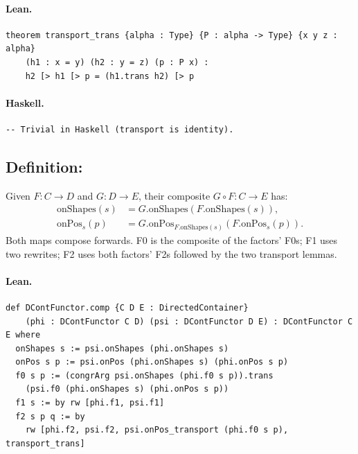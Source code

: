\documentclass[11pt,a4paper]{article}
\begin{document}
\paragraph{Lean.}
\begin{lstlisting}[style=lean]
theorem transport_trans {alpha : Type} {P : alpha -> Type} {x y z : alpha}
    (h1 : x = y) (h2 : y = z) (p : P x) :
    h2 [> h1 [> p = (h1.trans h2) [> p
\end{lstlisting}

\paragraph{Haskell.}
\begin{lstlisting}[style=haskell]
-- Trivial in Haskell (transport is identity).
\end{lstlisting}


\subsection{Definition: }

\begin{defn}
Given $F : C \to D$ and $G : D \to E$, their composite $G \circ F : C \to E$
has:
\begin{align*}
  \mathrm{onShapes}(s) &= G.\mathrm{onShapes}(F.\mathrm{onShapes}(s)), \\
  \mathrm{onPos}_s(p) &= G.\mathrm{onPos}_{F.\mathrm{onShapes}(s)}(F.\mathrm{onPos}_s(p)).
\end{align*}
Both maps compose forwards.  F0 is the composite of the factors' F0s; F1 uses
two rewrites; F2 uses both factors' F2s followed by the two transport lemmas.
\end{defn}

\paragraph{Lean.}
\begin{lstlisting}[style=lean]
def DContFunctor.comp {C D E : DirectedContainer}
    (phi : DContFunctor C D) (psi : DContFunctor D E) : DContFunctor C E where
  onShapes s := psi.onShapes (phi.onShapes s)
  onPos s p := psi.onPos (phi.onShapes s) (phi.onPos s p)
  f0 s p := (congrArg psi.onShapes (phi.f0 s p)).trans
    (psi.f0 (phi.onShapes s) (phi.onPos s p))
  f1 s := by rw [phi.f1, psi.f1]
  f2 s p q := by
    rw [phi.f2, psi.f2, psi.onPos_transport (phi.f0 s p), transport_trans]
\end{lstlisting}
\end{document}
